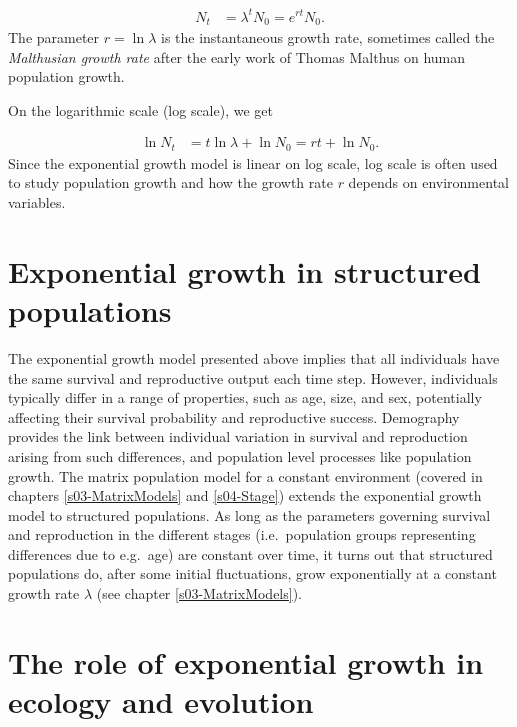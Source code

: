 \documentclass[
]{book}
\begin{document}
\begin{align}
N_t&=\lambda^tN_0=e^{rt}N_0.
\label{eq:exp2}
\end{align}
The parameter \(r=\ln \lambda\) is the instantaneous growth rate, sometimes called the \emph{Malthusian growth rate} after the early work of Thomas Malthus \citeyearpar{Malthus} on human population growth.

On the logarithmic scale (log scale), we get

\begin{align}
\ln N_t&=t \ln \lambda +\ln N_0=rt+\ln N_0.
\label{eq:exp3}
\end{align}
Since the exponential growth model is linear on log scale, log scale is often used to study population growth and how the growth rate \(r\) depends on environmental variables.

\hypertarget{exponential-growth-in-structured-populations}{%
\section{Exponential growth in structured populations}\label{exponential-growth-in-structured-populations}}

The exponential growth model presented above implies that all individuals have the same survival and reproductive output each time step. However, individuals typically differ in a range of properties, such as age, size, and sex, potentially affecting their survival probability and reproductive success. Demography provides the link between individual variation in survival and reproduction arising from such differences, and population level processes like population growth. The matrix population model for a constant environment (covered in chapters \ref{s03-MatrixModels} and \ref{s04-Stage}) extends the exponential growth model to structured populations. As long as the parameters governing survival and reproduction in the different stages (i.e.~population groups representing differences due to e.g.~age) are constant over time, it turns out that structured populations do, after some initial fluctuations, grow exponentially at a constant growth rate \(\lambda\) (see chapter \ref{s03-MatrixModels}).

\hypertarget{the-role-of-exponential-growth-in-ecology-and-evolution}{%
\section{The role of exponential growth in ecology and evolution}\label{the-role-of-exponential-growth-in-ecology-and-evolution}}
\end{document}
